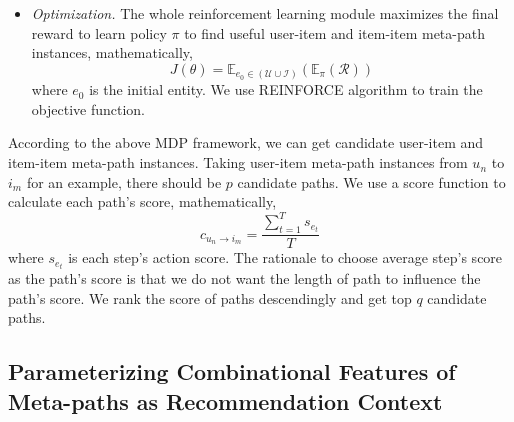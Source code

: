 \begin{itemize}
	\item \textit{Optimization.}
	The whole reinforcement learning module maximizes the final reward to learn policy $\pi$ to find useful user-item and item-item meta-path instances, mathematically,
	\begin{equation}
		J(\theta) = \mathbb{E}_{e_0\in (\mathcal{U} \cup \mathcal{I})} (\mathbb{E}_{\pi}(\mathcal{R}))
	\end{equation}
	where $e_0$ is the initial entity. We use REINFORCE \cite{williams1992simple} algorithm to train the objective function.
\end{itemize}

According to the above MDP framework, we can get candidate user-item and item-item meta-path instances. Taking user-item meta-path instances from $u_n$ to $i_m$ for an example, there should be $p$ candidate paths. We use a score function to calculate each path's score, mathematically,
\begin{equation}
	c_{u_n \rightarrow i_m} = \frac{\sum_{t=1}^{T} s_{e_t}}{T}
\end{equation}
where $s_{e_t}$ is each step's action score. The rationale to choose average step's score as the path's score is that we do not want the length of path to influence the path's score. We rank the score of paths descendingly and get top $q$ candidate paths. %


\subsection{Parameterizing Combinational Features of Meta-paths as Recommendation Context}

\label{subsec_seq_and_non_seq}

